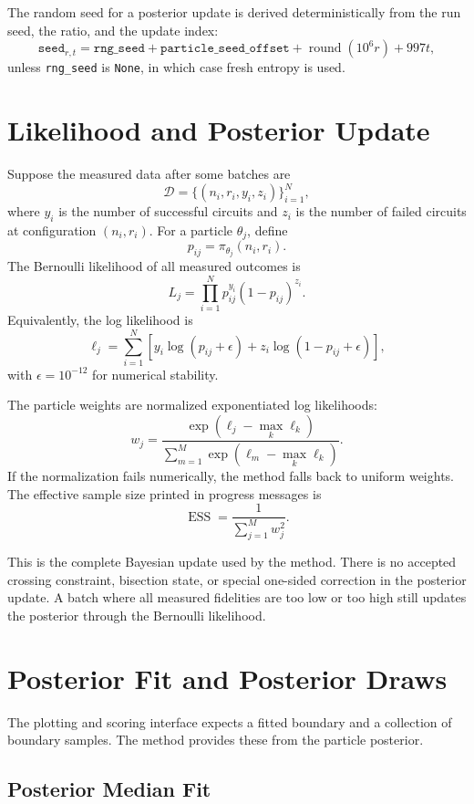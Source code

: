 \documentclass[11pt]{article}
\begin{document}
The random seed for a posterior update is derived deterministically from the
run seed, the ratio, and the update index:
\[
    \texttt{seed}_{r,t}
    =
    \texttt{rng\_seed}
    + \texttt{particle\_seed\_offset}
    + \operatorname{round}(10^6 r)
    + 997t,
\]
unless \texttt{rng\_seed} is \texttt{None}, in which case fresh entropy is
used.

\section{Likelihood and Posterior Update}

Suppose the measured data after some batches are
\[
    \mathcal{D}
    =
    \{(n_i,r_i,y_i,z_i)\}_{i=1}^N,
\]
where $y_i$ is the number of successful circuits and $z_i$ is the number of
failed circuits at configuration $(n_i,r_i)$. For a particle $\theta_j$, define
\[
    p_{ij} = \pi_{\theta_j}(n_i,r_i).
\]
The Bernoulli likelihood of all measured outcomes is
\[
    L_j
    =
    \prod_{i=1}^N
    p_{ij}^{y_i}
    (1-p_{ij})^{z_i}.
\]
Equivalently, the log likelihood is
\[
    \ell_j =
    \sum_{i=1}^N
    \left[
        y_i\log(p_{ij}+\epsilon)
        +
        z_i\log(1-p_{ij}+\epsilon)
    \right],
\]
with $\epsilon=10^{-12}$ for numerical stability.

The particle weights are normalized exponentiated log likelihoods:
\[
    w_j =
    \frac{\exp(\ell_j-\max_k \ell_k)}
         {\sum_{m=1}^M \exp(\ell_m-\max_k \ell_k)}.
\]
If the normalization fails numerically, the method falls back to uniform
weights. The effective sample size printed in progress messages is
\[
    \operatorname{ESS}
    =
    \frac{1}{\sum_{j=1}^M w_j^2}.
\]

This is the complete Bayesian update used by the method. There is no accepted
crossing constraint, bisection state, or special one-sided correction in the
posterior update. A batch where all measured fidelities are too low or too
high still updates the posterior through the Bernoulli likelihood.

\section{Posterior Fit and Posterior Draws}

The plotting and scoring interface expects a fitted boundary and a collection
of boundary samples. The method provides these from the particle posterior.

\subsection{Posterior Median Fit}
\end{document}
